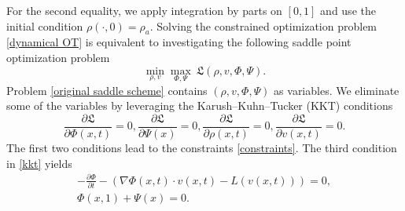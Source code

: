 \documentclass{article}
\begin{document}
For the second equality, we apply integration by parts on $[0,1]$ and use the initial condition $\rho(\cdot, 0)=\rho_a$.
Solving the constrained optimization problem \eqref{dynamical OT} is equivalent to investigating the following saddle point optimization problem
\begin{equation}
    \min_{\rho,{v}}  \max_{\Phi,\Psi}   ~\mathfrak{L}(\rho,{v},\Phi,\Psi).  \label{original saddle scheme}
\end{equation}
Problem \eqref{original saddle scheme} contains $(\rho,{v},\Phi,\Psi)$ as variables. We eliminate some of the variables by leveraging
the Karush–Kuhn–Tucker (KKT) conditions \citep{kuhn1951}
\begin{equation}
   \frac{\partial \mathfrak{L}}{\partial \Phi(x,t)}=0, \frac{\partial \mathfrak{L}}{\partial \Psi(x)} = 0, 
  \frac{\partial \mathfrak{L}}{\partial  \rho(x,t)} = 0,  \frac{\partial \mathfrak{L}}{\partial {v}(x,t)} = 0. \label{kkt}
\end{equation}
The first two conditions lead to the constraints \eqref{constraints}. The third condition in \eqref{kkt} yields
\begin{align}
   -\frac{\partial\Phi}{\partial t} - (\nabla\Phi(x,t)\cdot{v}(x,t) - L({v}(x,t))) = 0, \label{condition A original HJ}\\
   \Phi(x,1)+\Psi(x)=0.  \label{condition B}
\end{align}
\end{document}
